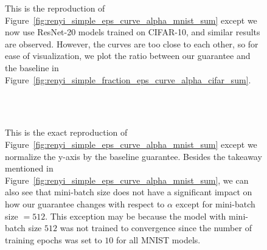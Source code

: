 \begin{figure}[t]
\centering
{}


\caption{This is the reproduction of Figure~\ref{fig:renyi_simple_eps_curve_alpha_mnist_sum} except we now use ResNet-20 models trained on CIFAR-10, and similar results are observed. However, the curves are too close to each other, so for ease of visualization, we plot the ratio between our guarantee and the baseline in Figure~\ref{fig:renyi_simple_fraction_eps_curve_alpha_cifar_sum}.
}
\label{fig:renyi_simple_eps_curve_alpha_cifar_sum}
\end{figure}

\begin{figure}[t]
\centering
{}
\\
\\
\caption{This is the exact reproduction of Figure~\ref{fig:renyi_simple_eps_curve_alpha_mnist_sum} except we normalize the y-axis by the baseline guarantee. Besides the takeaway mentioned in Figure~\ref{fig:renyi_simple_eps_curve_alpha_mnist_sum}, we can also see that mini-batch size does not have a significant impact  on how our guarantee changes with respect to $\alpha$ except for mini-batch size $=512$. This exception may be because the model with mini-batch size $512$ was not trained to convergence since the number of training epochs was set to $10$ for all MNIST models.
}
\label{fig:renyi_simple_fraction_eps_curve_alpha_mnist_sum}
\end{figure}

